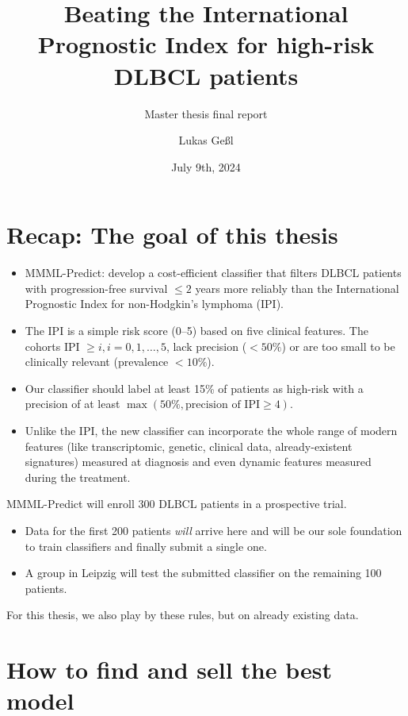 \documentclass[10pt, aspectratio=169]{beamer}
\title{Beating the International Prognostic Index for high-risk DLBCL patients}
\subtitle{Master thesis final report}
\date{July 9th, 2024}
\author{Lukas Geßl}
\institute{Chair of Statistical Bioinformatics, Regensburg University}
\begin{document}
\maketitle

\section{Recap: The goal of this thesis}

\begin{frame}{}
  \begin{itemize}
    \item MMML-Predict: develop a cost-efficient classifier 
    that filters DLBCL patients with progression-free survival $\leq 2$ years more reliably 
    than the International Prognostic Index for non-Hodgkin's lymphoma (IPI).
    \item The IPI \cite{ipi93} is a simple risk score (0--5) based on five clinical features. 
    The cohorts IPI $\geq i, i = 0, 1, \ldots, 5$, lack precision ($< 50 \%$) or 
    are too small to be clinically relevant (prevalence $< 10 \%$).
    \item Our classifier should label at least 15\% of patients as high-risk with a precision
    of at least $\max(50\%, \text{precision of IPI} \geq 4)$.
    \item Unlike the IPI, the new classifier can incorporate the whole range of 
    modern features (like transcriptomic, genetic, clinical data, already-existent 
    signatures) measured at diagnosis and even dynamic features measured during 
    the treatment.
  \end{itemize}
\end{frame}

\begin{frame}
  MMML-Predict will enroll 300 DLBCL patients in a prospective trial.
  \begin{itemize}
    \item Data for the first 200 patients \textit{will} arrive here and will be 
      our sole foundation to train classifiers and finally submit a single one.
    \item A group in Leipzig will test the submitted classifier on the remaining 
      100 patients.
  \end{itemize}
  For this thesis, we also play by these rules, but on already existing data.
\end{frame}

\section{How to find and sell the best model}
\end{document}
